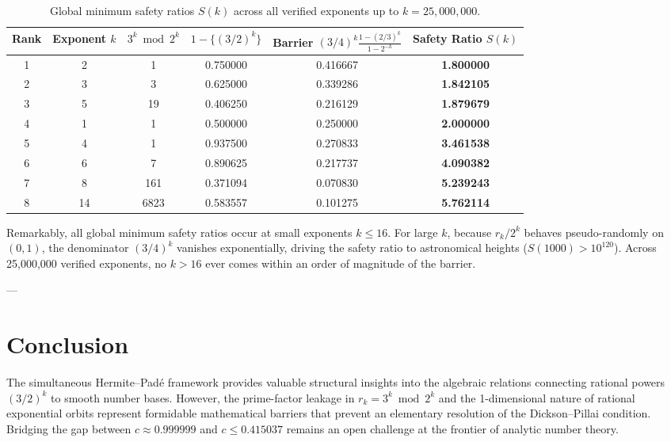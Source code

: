 \documentclass[11pt,reqno]{article}
\theoremstyle{plain}
\theoremstyle{definition}
\numberwithin{equation}{section}
\begin{document}
\begin{table}[h]
\centering
\begin{tabular}{cccccc}
\toprule
Rank & Exponent $k$ & $3^k \bmod 2^k$ & $1 - \{(3/2)^k\}$ & Barrier $(3/4)^k \frac{1-(2/3)^k}{1-2^{-k}}$ & Safety Ratio $S(k)$ \\
\midrule
1 & 2 & 1 & 0.750000 & 0.416667 & \textbf{1.800000} \\
2 & 3 & 3 & 0.625000 & 0.339286 & \textbf{1.842105} \\
3 & 5 & 19 & 0.406250 & 0.216129 & \textbf{1.879679} \\
4 & 1 & 1 & 0.500000 & 0.250000 & \textbf{2.000000} \\
5 & 4 & 1 & 0.937500 & 0.270833 & \textbf{3.461538} \\
6 & 6 & 7 & 0.890625 & 0.217737 & \textbf{4.090382} \\
7 & 8 & 161 & 0.371094 & 0.070830 & \textbf{5.239243} \\
8 & 14 & 6823 & 0.583557 & 0.101275 & \textbf{5.762114} \\
\bottomrule
\end{tabular}
\caption{Global minimum safety ratios $S(k)$ across all verified exponents up to $k = 25{,}000{,}000$.}
\label{tab:safety_ratios}
\end{table}

Remarkably, all global minimum safety ratios occur at small exponents $k \le 16$. For large $k$, because $r_k / 2^k$ behaves pseudo-randomly on $(0, 1)$, the denominator $(3/4)^k$ vanishes exponentially, driving the safety ratio to astronomical heights ($S(1000) > 10^{120}$). Across 25,000,000 verified exponents, no $k > 16$ ever comes within an order of magnitude of the barrier.

---

\section{Conclusion}
The simultaneous Hermite--Pad\'e framework provides valuable structural insights into the algebraic relations connecting rational powers $(3/2)^k$ to smooth number bases. However, the prime-factor leakage in $r_k = 3^k \bmod 2^k$ and the 1-dimensional nature of rational exponential orbits represent formidable mathematical barriers that prevent an elementary resolution of the Dickson--Pillai condition. Bridging the gap between $c \approx 0.999999$ and $c \le 0.415037$ remains an open challenge at the frontier of analytic number theory.
\end{document}

